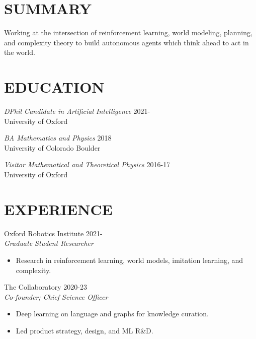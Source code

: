 \documentclass[margin]{res}
\begin{document}
\begin{resume}
    \section{SUMMARY}
    Working at the intersection of reinforcement learning, world modeling, planning, and complexity theory to
    build autonomous agents which think ahead to act in the world.


  \section{EDUCATION} {\sl DPhil Candidate in Artificial Intelligence } \hfill 2021-\\
                University of Oxford

  {\sl BA Mathematics and Physics} \hfill 2018\\
  University of Colorado Boulder

  {\sl Visitor Mathematical and Theoretical Physics} \hfill 2016-17\\
  University of Oxford

\section{EXPERIENCE} Oxford Robotics Institute \hfill 2021- \\
                 {\sl Graduate Student Researcher}
                 \begin{itemize}  \itemsep -2pt %
                 \item Research in reinforcement learning, world models, imitation learning, and complexity.
                 \end{itemize}

                The Collaboratory \hfill 2020-23 \\
                 {\sl Co-founder; Chief Science Officer}
                 \begin{itemize}  \itemsep -2pt %
                 \item Deep learning on language and graphs for knowledge curation.
                 \item Led product strategy, design, and ML R\&D.
                 \end{itemize}


\end{resume}
\end{document}
